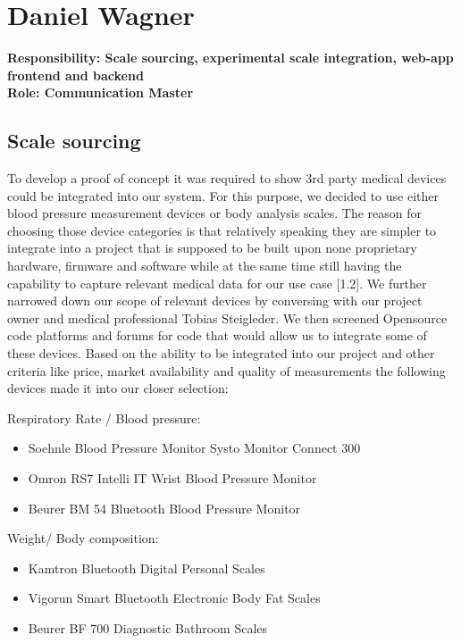 \section{Daniel Wagner}
\textbf{Responsibility: Scale sourcing, experimental scale integration, web-app frontend and  backend}\\
\textbf{Role: Communication Master}\\

\subsection{Scale sourcing}

To develop a proof of concept it was required to show 3rd party medical devices could be integrated into our system. For this purpose, we decided to use either blood pressure measurement devices or body analysis scales. The reason for choosing those device categories is that relatively speaking they are simpler to integrate into a project that is supposed to be built upon none proprietary hardware, firmware and software while at the same time still having the capability to capture relevant medical data for our use case [1.2]. We further narrowed down our scope of relevant devices by conversing with our project owner and medical professional Tobias Steigleder. We then screened Opensource code platforms and forums for code that would allow us to integrate some of these devices. Based on the ability to be integrated into our project and other criteria like price, market availability and quality of measurements the following devices made it into our closer selection:

Respiratory Rate / Blood pressure:

\begin{itemize}
	\item Soehnle Blood Pressure Monitor Systo Monitor Connect 300

	\item Omron RS7 Intelli IT Wrist Blood Pressure Monitor

	\item Beurer BM 54 Bluetooth Blood Pressure Monitor
\end{itemize}

Weight/ Body composition:

\begin{itemize}
	\item Kamtron Bluetooth Digital Personal Scales

	\item Vigorun Smart Bluetooth Electronic Body Fat Scales

	\item Beurer BF 700 Diagnostic Bathroom Scales\\

\end{itemize}

